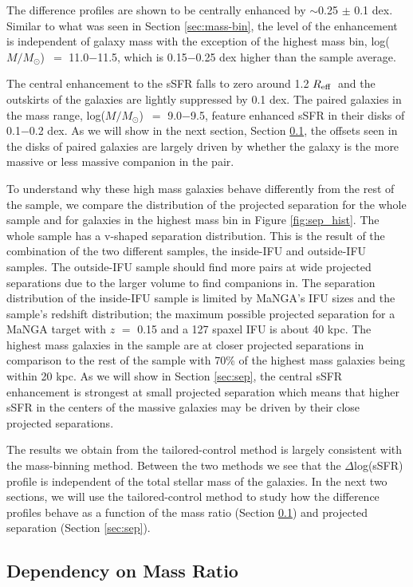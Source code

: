 \documentclass[iop,revtex4,twocolumn,apj,numberedappendix,appendixfloats]{emulateapj}
\newcommand{\reff}{$R_{\rm eff}$}
\newcommand{\logm}{log($M/M_{\odot}$)}
\begin{document}
The difference profiles are shown to be centrally enhanced by $\sim$0.25 $\pm$ 0.1 dex. Similar to what was seen in Section \ref{sec:mass-bin}, the level of the enhancement is independent of galaxy mass with the exception of the highest mass bin, \logm\ $=$ 11.0$-$11.5, which is 0.15$-$0.25 dex higher than the sample average. 

The central enhancement to the sSFR falls to zero around 1.2 \reff\ and the outskirts of the galaxies are lightly suppressed by 0.1 dex. The paired galaxies in the mass range, \logm\ $=$ 9.0$-$9.5, feature enhanced sSFR in their disks of 0.1$-$0.2 dex. As we will show in the next section, Section \ref{sec:dm}, the offsets seen in the disks of paired galaxies are largely driven by whether the galaxy is the more massive or less massive companion in the pair.

To understand why these high mass galaxies behave differently from the rest of the sample, we compare the distribution of the projected separation for the whole sample and for galaxies in the highest mass bin in Figure \ref{fig:sep_hist}. The whole sample has a v-shaped separation distribution. This is the result of the combination of the two different samples, the inside-IFU and outside-IFU samples. The outside-IFU sample should find more pairs at wide projected separations due to the larger volume to find companions in. The separation distribution of the inside-IFU sample is limited by MaNGA's IFU sizes and the sample's redshift distribution; the maximum possible projected separation for a MaNGA target with $z$ $=$ 0.15 and a 127 spaxel IFU is about 40 kpc. The highest mass galaxies in the sample are at closer projected separations in comparison to the rest of the sample with 70\% of the highest mass galaxies being within 20 kpc. As we will show in Section \ref{sec:sep}, the central sSFR enhancement is strongest at small projected separation which means that higher sSFR in the centers of the massive galaxies may be driven by their close projected separations. 

The results we obtain from the tailored-control method is largely consistent with the mass-binning method. Between the two methods we see that the $\Delta$log(sSFR) profile is independent of the total stellar mass of the galaxies. In the next two sections, we will use the tailored-control method to study how the difference profiles behave as a function of the mass ratio (Section \ref{sec:dm}) and projected separation (Section \ref{sec:sep}).

\subsection{Dependency on Mass Ratio}\label{sec:dm}
\end{document}
